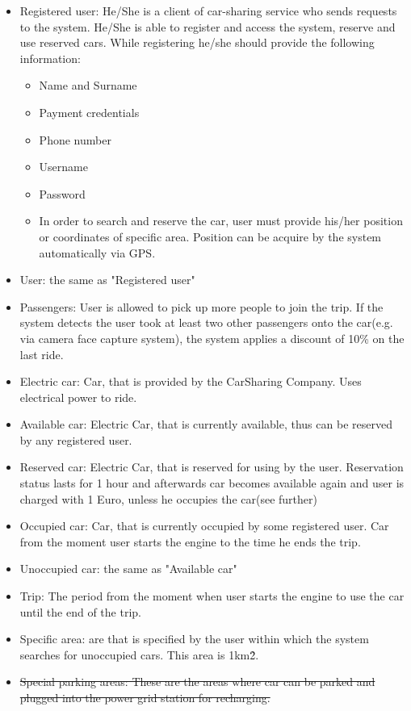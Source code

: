 \documentclass[12pt, letterpaper]{article}
\begin{document}
\begin{itemize}
	\item Registered user: He/She is a client of car-sharing service who sends requests to the 
	system. He/She is able to register and access the system, reserve and use reserved
	cars. While registering he/she should provide the following information:
	\begin{itemize}
		\item Name and Surname
		\item Payment credentials
		\item Phone number
		\item Username
		\item Password
		\item In order to search and reserve the car, user must provide his/her position or
	coordinates of specific area. Position can be acquire by the system
	automatically via GPS.
	\end{itemize}
	\item User: the same as "Registered user"
	\item Passengers: User is allowed to pick up more people to join the trip. If the system detects the user took at least two other passengers onto the car(e.g. via camera face capture system), the system applies a discount of 10\% on the last ride.
	\item Electric car: Car, that is provided by the CarSharing Company. Uses electrical power to ride.
	\item Available car: Electric Car, that is currently available, thus can be reserved by any registered user.
	\item Reserved car: Electric Car, that is reserved for using by the user. Reservation status lasts for 1 hour and afterwards car becomes available again and user is charged with 1 Euro, unless he occupies the car(see further)
	\item Occupied car: Car, that is currently occupied by some registered user. Car from the moment user starts the engine to the time he ends the trip.
	\item Unoccupied car: the same as "Available car"
	\item Trip: The period from the moment when user starts the engine to use the car until the end of the trip.
	\item Specific area: are that is specified by the user within which the system searches for unoccupied cars. This area is 1km\^2.
	\item \sout{Special parking areas: These are the areas where car can be parked and plugged into the power grid station for recharging.}

\end{itemize}
\end{document}

